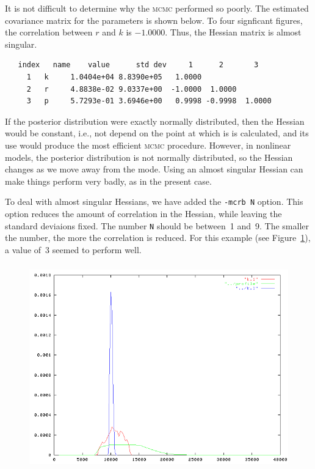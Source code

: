 \documentclass{admbmanual}
\begin{document}
It is not difficult to determine why the \textsc{mcmc} performed so poorly.
The estimated covariance matrix for the parameters is shown below.
To four signficant figures, the correlation between $r$ and $k$
is $-1.0000$.  Thus, the Hessian matrix is almost singular.
\begin{lstlisting}
   index   name    value      std dev     1      2       3   
     1   k     1.0404e+04 8.8390e+05   1.0000
     2   r     4.8838e-02 9.0337e+00  -1.0000  1.0000
     3   p     5.7293e-01 3.6946e+00   0.9998 -0.9998  1.0000
\end{lstlisting}
If the posterior distribution were exactly normally distributed, then
the Hessian would be constant, i.e., not depend on the
point at which is is calculated, and its use would 
produce the most efficient \textsc{mcmc}
procedure. However, in nonlinear models, the posterior distribution is
not normally distributed, so the Hessian changes as we move away
from the mode.  Using an almost singular
Hessian can make things perform very badly, as in the present case.

To deal with almost singular Hessians, we have added the \texttt{-mcrb N}
option.
This option reduces the amount of correlation in the Hessian, while leaving
the standard deviaions fixed. The number \texttt{N} should be between~1 and~9.  
The smaller the number, the more the correlation is reduced.
For this example (see Figure~\ref{fig:07}), a value of~3 seemed to perform well.
\begin{figure}[h]
\includegraphics[height=3.5in, width=\textwidth]{mcrb3-50K.png}
\emptycaption
\label{fig:07}
\end{figure}
\end{document}
